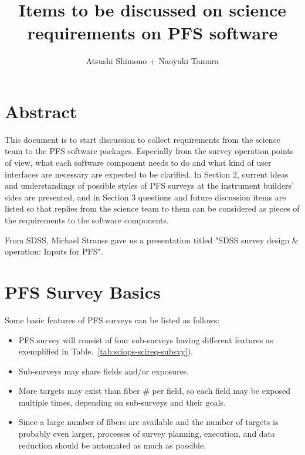 \documentclass[a4paper,notitlepage]{article}
\title{Items to be discussed on science requirements on PFS software}
\author{Atsushi Shimono + Naoyuki Tamura}
\begin{document}

\ssnhead

\section{Abstract}

This document is to start discussion to collect requirements from the
science team to the PFS software packages. Especially from the survey
operation points of view, what each software component needs to do and
what kind of user interfaces are necessary are expected to be
clarified. In Section 2, current ideas and understandings of possible
styles of PFS surveys at the instrument builders' sides are presented,
and in Section 3 questions and future discussion items are listed so
that replies from the science team to them can be considered as pieces
of the requirements to the software components.

From SDSS, Michael Strauss gave us a presentation titled "SDSS survey
design \& operation: Inputs for PFS".

\section{PFS Survey Basics}

Some basic features of PFS surveys can be listed as follows:
\begin{itemize}
 \item PFS survey will consist of four sub-surveys having different
       features as exemplified in
       Table.~\ref{tab:sciops-scireq-subsvy}).
 \item Sub-surveys may share fields and/or exposures.
 \item More targets may exist than fiber \# per field, so each field
       may be exposed multiple times, depending on sub-surveys and
       their goals.
 \item Since a large number of fibers are available and the number of
       targets is probably even larger, processes of survey planning,
       execution, and data reduction should be automated as much as
       possible.
\end{itemize}
\end{document}
